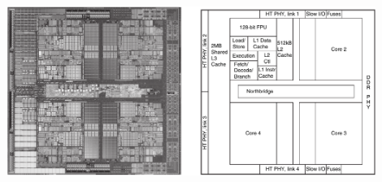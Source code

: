 \begin{frame}{}
\begin{center}
\includegraphics[width=0.9\textwidth, height=0.80\textheight]{docs/images/amd-3}
\end{center}
\end{frame}
